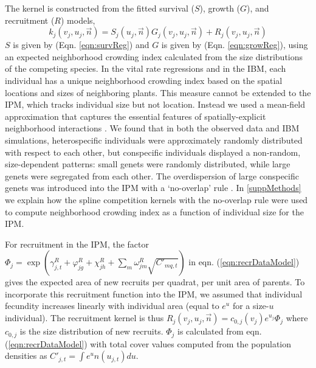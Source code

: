 \documentclass[11pt]{article}
\begin{document}
\begin{doublespacing}
The kernel is constructed from the fitted survival ($S$), growth ($G$), and recruitment ($R$) models, 
\begin{equation}
k_j(v_j,u_j,\vec{n})=S_j(u_j,\vec{n})G_j(v_j,u_j,\vec{n})+R_j(v_j,u_j,\vec{n}) 
\label{eqn:IPM} 
\end{equation}
$S$ is given by (Eqn. \ref{eqn:survReg}) and $G$ is given by (Eqn. \ref{eqn:growReg}), using an expected neighborhood crowding
index calculated from the size distributions of the competing species. In the vital rate regressions and in the IBM, each 
individual has a unique neighborhood crowding index based on the spatial locations and sizes of neighboring plants. This 
measure cannot be extended to the IPM, which tracks individual size but not location. Instead we used a 
mean-field approximation that captures the essential features of spatially-explicit neighborhood interactions \citep{adler_coexistence_2010}. 
We found that in both the observed data and IBM simulations, heterospecific individuals were approximately randomly distributed with respect to each other, 
but conspecific individuals displayed a non-random, size-dependent patterns: small genets were randomly distributed, while large genets 
were segregated from each other. The overdispersion of large conspecific genets was introduced into the IPM 
with a `no-overlap' rule \citep{adler_coexistence_2010}. In \ref{suppMethods} we explain how the spline competition kernels with the no-overlap rule were used to compute neighborhood crowding index as a function of individual size for the IPM.  

For recruitment in the IPM, the factor $ \Phi_j  =\exp{\left(\gamma_{j,t}^R +  \varphi_{jg}^R + \chi_{jh}^R + 
\sum \limits_{m} \omega_{jm}^R \sqrt{C'_{mq,t}} \right)}$
in eqn. (\ref{eqn:recrDataModel}) gives the expected 
area of new recruits per quadrat, per unit area of parents. To incorporate this recruitment function into the IPM, we assumed that individual fecundity increases linearly with individual area (equal to $e^u$ for a size-$u$ individual). The recruitment kernel is thus
$R_j(v_j,u_j,\vec{n})=c_{0,j}(v_j)e^{u_j}\Phi_j$ \citep{adler_coexistence_2010} where $c_{0,j}$ is the
size distribution of new recruits. $\Phi_j$ is calculated from eqn. (\ref{eqn:recrDataModel}) with total cover values computed from the population densities as $C'_{j,t} = \int e^u n(u_{j,t}) du$. 


\end{doublespacing}
\end{document}
